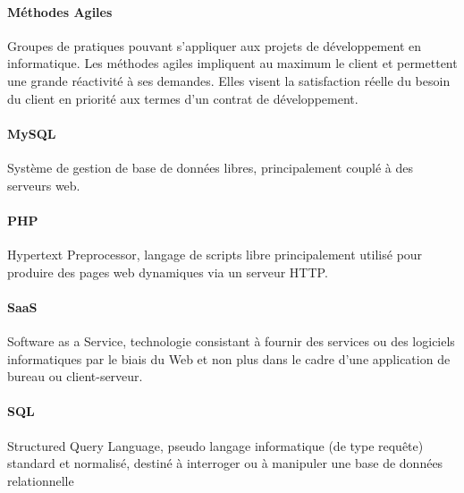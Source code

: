\paragraph{Méthodes Agiles}
Groupes de pratiques pouvant s'appliquer aux projets de développement en informatique. Les méthodes agiles impliquent au maximum le client et permettent une grande réactivité à ses demandes. Elles visent la satisfaction réelle du besoin du client en priorité aux termes d'un contrat de développement.
\paragraph{MySQL} Système de gestion de base de données libres, principalement couplé à des serveurs web.
\paragraph{PHP} Hypertext Preprocessor, langage de scripts libre principalement utilisé pour
produire des pages web dynamiques via un serveur HTTP.
\paragraph{SaaS} Software as a Service, technologie consistant à fournir des services ou des logiciels informatiques par le biais du Web et non plus dans le cadre d'une application de bureau ou client-serveur.
\paragraph{SQL} Structured Query Language, pseudo
langage informatique (de type requête) standard et normalisé, destiné à interroger ou
à manipuler une base de données relationnelle




